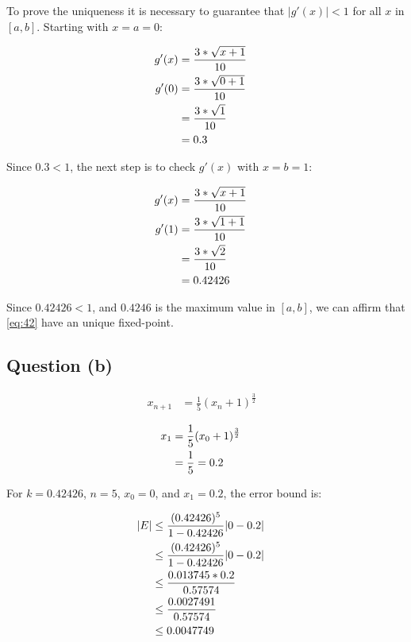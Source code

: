 		To prove the uniqueness it is necessary to guarantee that $|g'(x)| < 1$ for all $x$ in $[a,b]$. Starting with $x = a = 0$:

		\begin{align}
			g'(x) &= \frac{3*\sqrt{x+1}}{10}& \notag \\
			g'(0) &= \frac{3*\sqrt{0+1}}{10}& \notag \\
			&= \frac{3*\sqrt{1}}{10}& \notag \\
			&= 0.3&
		\label{eq:42derivate0x}
		\end{align}

		Since $0.3 < 1$, the next step is to check $g'(x)$ with $x = b = 1$:

		\begin{align}
			g'(x) &= \frac{3*\sqrt{x+1}}{10}& \notag \\
			g'(1) &= \frac{3*\sqrt{1+1}}{10}& \notag \\
			&= \frac{3*\sqrt{2}}{10}& \notag \\
			&= 0.42426&
		\label{eq:42derivate1x}
		\end{align}

		Since $0.42426 < 1$, and $0.4246$ is the maximum value in $[a,b]$, we can affirm that \cref{eq:42} have an unique fixed-point.

	\subsection{Question (b)}
	
		\begin{align}
			x_{n+1} &= \frac{1}{5}(x_{n}+1)^{\frac{3}{2}}&
		\label{eq:42fixed}
		\end{align}

		\begin{align}
			x_{1} &= \frac{1}{5}(x_{0}+1)^{\frac{3}{2}}& \notag \\
			&= \frac{1}{5} = 0.2&
			\label{eq:42fixed1x}
		\end{align}

		For $k = 0.42426$, $n = 5$, $x_{0} = 0$, and $x_{1} = 0.2$, the error bound is:

		\begin{align}
			| E | &\le \frac{(0.42426)^{5}}{1-0.42426}|0 - 0.2|& \notag \\
			&\le \frac{(0.42426)^{5}}{1-0.42426}|0 - 0.2|& \notag \\
			&\le \frac{0.013745*0.2}{0.57574}& \notag \\
			&\le \frac{0.0027491}{0.57574}& \notag \\
			&\le 0.0047749&
		\label{eq:42error5x}
		\end{align}

